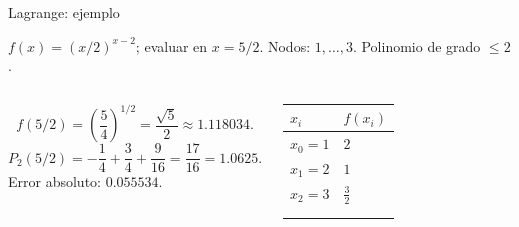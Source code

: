 \documentclass[main.tex]{subfiles}
\begin{document}
\begin{frame}[t]{Lagrange: ejemplo}
\par\noindent\begin{minipage}[t][7.5mm][t]{\textwidth}\small\strut $f(x)=(x/2)^{x-2}$; evaluar en $x=5/2$. Nodos: $1,\ldots,3$. Polinomio de grado $\le 2$.\end{minipage}\par\nointerlineskip
\begin{columns}[T]\small\setlength{\abovedisplayskip}{4pt}\setlength{\belowdisplayskip}{4pt}\[f(5/2)=\left(\frac54\right)^{1/2}=\frac{\sqrt5}{2}\approx1.118034.\]\[P_2(5/2)=-\frac14+\frac34+\frac9{16}=\frac{17}{16}=1.0625.\]\small Error absoluto: $0.055534$.\begingroup\small\setlength{\tabcolsep}{3pt}\begin{center}\begin{tabular}{|C{.42\textwidth}|C{.42\textwidth}|}\hline
\rule[-2mm]{0pt}{6mm}$x_i$&$f(x_i)$\\\hline
\rule[-2.5mm]{0pt}{6mm}$x_0=1$&$2$\\\hline
\rule[-2.5mm]{0pt}{6mm}$x_1=2$&$1$\\\hline
\rule[-2.5mm]{0pt}{6mm}$x_2=3$&$\frac{3}{2}$\\\hline
\rule[-2.5mm]{0pt}{6mm}&\\\hline
\rule[-2.5mm]{0pt}{6mm}&\\\hline
\end{tabular}\end{center}\endgroup\par
\end{columns}
\end{frame}
\end{document}
